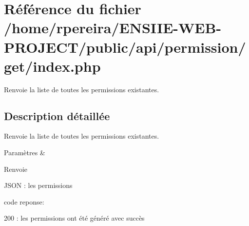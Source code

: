 \hypertarget{permission_2get_2index_8php}{}\section{Référence du fichier /home/rpereira/\+E\+N\+S\+I\+I\+E-\/\+W\+E\+B-\/\+P\+R\+O\+J\+E\+C\+T/public/api/permission/get/index.php}
\label{permission_2get_2index_8php}


Renvoie la liste de toutes les permissions existantes.  




\subsection{Description détaillée}
Renvoie la liste de toutes les permissions existantes. 


\begin{DoxyParams}{Paramètres}
{\em } & \\
\hline
\end{DoxyParams}
\begin{DoxyReturn}{Renvoie}

\begin{DoxyItemize}
\item J\+S\+ON \+: les permissions
\item code reponse\+:
\begin{DoxyItemize}
\item 200 \+: les permissions ont été généré avec succès 
\end{DoxyItemize}
\end{DoxyItemize}
\end{DoxyReturn}
